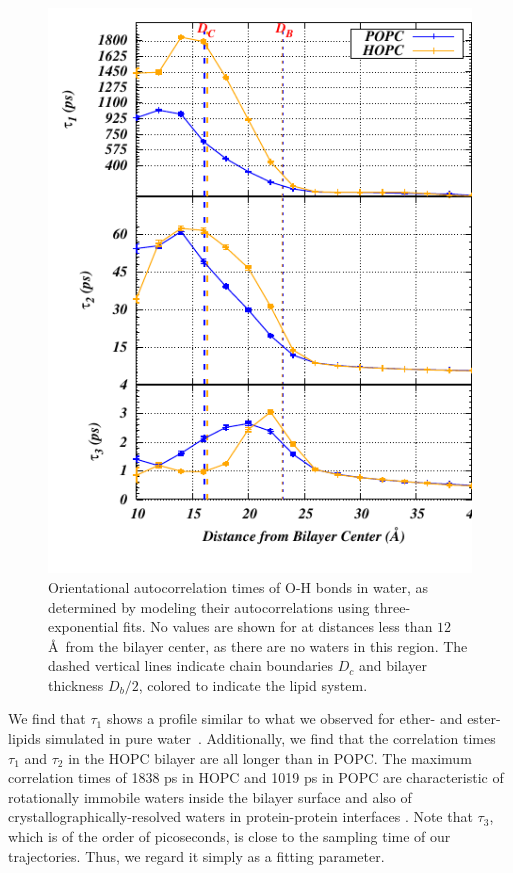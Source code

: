 \documentclass[12pt,openany,final]{book}
\begin{document}
\begin{figure}[p]
    \caption[Orientational autocorrelation times of O-H bonds in water, as determined by modeling their autocorrelations using three-exponential fits.]{ 
Orientational autocorrelation times of O-H bonds in water, as determined by modeling their autocorrelations using three-exponential fits. 
No values are shown for at distances less than $12$ \AA~from the bilayer center, as there are no waters in this region. 
The dashed vertical lines indicate chain boundaries $D_c$ and bilayer thickness $D_b/2$, colored to indicate the lipid system.}
\label{fig:waterautotime}
\includegraphics[height=0.66\textheight]{Corrtime}
\end{figure}
We find that $\tau_1$ shows a profile similar to what we observed for ether- and ester-lipids 
simulated in pure water~\cite{kruczek:2017:ether}. Additionally, we find that the correlation times $\tau_1$ and $\tau_2$ in the 
HOPC bilayer are all longer than in POPC. The maximum correlation times of 1838 ps in HOPC and 1019 ps in 
POPC are characteristic of rotationally immobile waters inside the bilayer surface 
and also of crystallographically-resolved waters in 
protein-protein interfaces \cite{dutta:2014}. Note that $\tau_3$, which 
is of the order of picoseconds, is close to the sampling time of our trajectories. Thus, we regard it simply as a fitting parameter.
\end{document}

